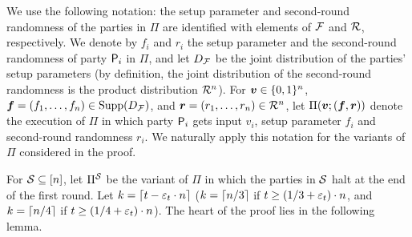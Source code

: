 We use the following notation: the setup parameter and second-round randomness of the parties in $\Pi$ are identified with elements of $\mathcal{F}$ and $\mathcal{R}$, respectively. We denote by $f_i$ and $r_i$ the setup parameter and the second-round
randomness of party $\mathsf{P}_i$ in $\Pi$, and let $D_{\cal F}$ be the joint distribution of the parties' setup parameters (by definition, the joint distribution of the second-round randomness is the product distribution $\mathcal{R}^n$). For ${ \boldsymbol{v}} \in {\{0,1\}^n}$, ${ \boldsymbol{f}}=(f_1,\ldots,f_n) \in \operatorname{Supp}(D_{\cal F})$, and ${ \boldsymbol{r}}=(r_1,\ldots,r_n) \in\mathcal{R}^n$, let $\Pi({ \boldsymbol{v}};({ \boldsymbol{f}},{ \boldsymbol{r}}))$ denote the execution of $\Pi$ in which party $\mathsf{P}_i$ gets input $v_i$, setup parameter $f_i$ and second-round randomness $r_i$. We naturally apply this notation for the variants of $\Pi$ considered in the proof.



For ${\cal{S}}\subseteq[n]$, let $\Pi^{\cal{S}}$ be the variant of $\Pi$ in which the parties in ${\cal{S}}$ halt at the end of the first round. Let $k = \left\lceil {t-\varepsilon_t\cdot n} \right\rceil$ (\ie $k = \left\lceil n/3 \right\rceil$ if $t\ge (1/3 + \varepsilon_t)\cdot n$, and $k = \left\lceil n/4 \right\rceil$ if $t\ge (1/4 + \varepsilon_t)\cdot n$). The heart of the proof lies in the following lemma.

